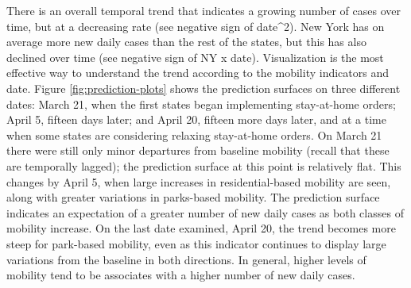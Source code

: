 \documentclass[]{elsarticle} %
\begin{document}
There is an overall temporal trend that indicates a growing number of
cases over time, but at a decreasing rate (see negative sign of
date\^{}2). New York has on average more new daily cases than the rest
of the states, but this has also declined over time (see negative sign
of NY x date). Visualization is the most effective way to understand the
trend according to the mobility indicators and date. Figure
\ref{fig:prediction-plots} shows the prediction surfaces on three
different dates: March 21, when the first states began implementing
stay-at-home orders; April 5, fifteen days later; and April 20, fifteen
more days later, and at a time when some states are considering relaxing
stay-at-home orders. On March 21 there were still only minor departures
from baseline mobility (recall that these are temporally lagged); the
prediction surface at this point is relatively flat. This changes by
April 5, when large increases in residential-based mobility are seen,
along with greater variations in parks-based mobility. The prediction
surface indicates an expectation of a greater number of new daily cases
as both classes of mobility increase. On the last date examined, April
20, the trend becomes more steep for park-based mobility, even as this
indicator continues to display large variations from the baseline in
both directions. In general, higher levels of mobility tend to be
associates with a higher number of new daily cases.
\end{document}
